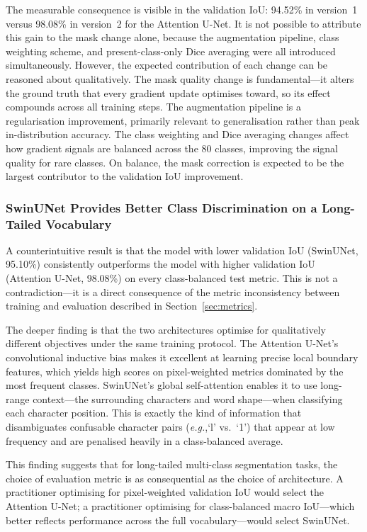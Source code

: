 \documentclass[a4paper,11pt]{article}
\newcommand{\eg}{\emph{e.g.},\xspace}
\begin{document}
The measurable consequence is visible in the validation IoU: 94.52\% in version~1 versus
98.08\% in version~2 for the Attention U-Net. It is not possible to attribute this gain to
the mask change alone, because the augmentation pipeline, class weighting scheme, and
present-class-only Dice averaging were all introduced simultaneously. However, the
expected contribution of each change can be reasoned about qualitatively. The mask quality
change is fundamental---it alters the ground truth that every gradient update optimises
toward, so its effect compounds across all training steps. The augmentation pipeline is a
regularisation improvement, primarily relevant to generalisation rather than peak
in-distribution accuracy. The class weighting and Dice averaging changes affect how
gradient signals are balanced across the 80 classes, improving the signal quality for
rare classes. On balance, the mask correction is expected to be the largest contributor
to the validation IoU improvement.

\subsubsection{SwinUNet Provides Better Class Discrimination on a Long-Tailed Vocabulary}

A counterintuitive result is that the model with lower validation IoU (SwinUNet, 95.10\%)
consistently outperforms the model with higher validation IoU (Attention U-Net, 98.08\%)
on every class-balanced test metric. This is not a contradiction---it is a direct
consequence of the metric inconsistency between training and evaluation described in
Section~\ref{sec:metrics}.

The deeper finding is that the two architectures optimise for qualitatively different
objectives under the same training protocol. The Attention U-Net's convolutional inductive
bias makes it excellent at learning precise local boundary features, which yields high
scores on pixel-weighted metrics dominated by the most frequent classes. SwinUNet's global
self-attention enables it to use long-range context---the surrounding characters and word
shape---when classifying each character position. This is exactly the kind of information
that disambiguates confusable character pairs (\eg `l' vs.\ `1') that appear at low
frequency and are penalised heavily in a class-balanced average.

This finding suggests that for long-tailed multi-class segmentation tasks, the choice of
evaluation metric is as consequential as the choice of architecture. A practitioner
optimising for pixel-weighted validation IoU would select the Attention U-Net; a
practitioner optimising for class-balanced macro IoU---which better reflects performance
across the full vocabulary---would select SwinUNet.
\end{document}
